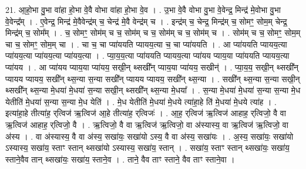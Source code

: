 \documentclass[17pt]{extarticle}
\begin{document}
21. आ॒हो॒भा वु॒भा वा॑हा हो॒भा वे॒वै वोभा वा॑हा हो॒भा वे॒व । . उ॒भा वे॒वै वोभा वु॒भा वे॒वेन्द्र॒ मिन्द्र॑ मे॒वोभा वु॒भा वे॒वेन्द्र᳚म् । . ए॒वेन्द्र॒ मिन्द्र॑ मे॒वैवेन्द्र॑म् च॒ चेन्द्र॑ मे॒वै वेन्द्र॑म् च । . इन्द्र॑म् च॒ चेन्द्र॒ मिन्द्र॑म् च॒ सोमꣳ॒॒ सोम॒म् चेन्द्र॒ मिन्द्र॑म् च॒ सोम᳚म् । . च॒ सोमꣳ॒॒ सोम॑म् च च॒ सोम॑म् च च॒ सोम॑म् च च॒ सोम॑म् च । . सोम॑म् च च॒ सोमꣳ॒॒ सोम॒म् चा च॒ सोमꣳ॒॒ सोम॒म् चा । . चा च॒ चा प्या॑ययति प्यायय॒त्या च॒ चा प्या॑ययति । . आ प्या॑ययति प्यायय॒त्या प्या॑यय॒त्या प्या॑यय॒त्या प्या॑यय॒त्या । . प्या॒य॒य॒त्या प्या॑ययति प्यायय॒त्या प्या॑यय प्याय॒या प्या॑ययति प्यायय॒त्या प्या॑यय । . आ प्या॑यय प्याय॒या प्या॑यय॒ सखी॒न् थ्सखी᳚न् प्याय॒या प्या॑यय॒ सखीन्॑ । . प्या॒य॒य॒ सखी॒न् थ्सखी᳚न् प्यायय प्यायय॒ सखी᳚न् थ्स॒न्या स॒न्या सखी᳚न् प्यायय प्यायय॒ सखी᳚न् थ्स॒न्या । . सखी᳚न् थ्स॒न्या स॒न्या सखी॒न् थ्सखी᳚न् थ्स॒न्या मे॒धया॑ मे॒धया॑ स॒न्या सखी॒न् थ्सखी᳚न् थ्स॒न्या मे॒धया᳚ । . स॒न्या मे॒धया॑ मे॒धया॑ स॒न्या स॒न्या मे॒ध येतीति॑ मे॒धया॑ स॒न्या स॒न्या मे॒ध येति॑ । . मे॒ध येतीति॑ मे॒धया॑ मे॒धये त्या॑हा॒हे ति॑ मे॒धया॑ मे॒धये त्या॑ह । . इत्या॑हा॒हे तीत्या॑ह॒ र्‌त्विज॑ ऋ॒त्विज॑ आ॒हे तीत्या॑ह॒ र्‌त्विजः॑ । . आ॒ह॒ र्‌त्विज॑ ऋ॒त्विज॑ आहाह॒ र्‌त्विजो॒ वै वा ऋ॒त्विज॑ आहाह॒ र्‌त्विजो॒ वै । . ऋ॒त्विजो॒ वै वा ऋ॒त्विज॑ ऋ॒त्विजो॒ वा अ॑स्यास्य॒ वा ऋ॒त्विज॑ ऋ॒त्विजो॒ वा अ॑स्य । . वा अ॑स्यास्य॒ वै वा अ॑स्य॒ सखा॑यः॒ सखा॑यो ऽस्य॒ वै वा अ॑स्य॒ सखा॑यः । . अ॒स्य॒ सखा॑यः॒ सखा॑यो ऽस्यास्य॒ सखा॑य॒ स्ताꣳ स्तान् थ्सखा॑यो ऽस्यास्य॒ सखा॑य॒ स्तान् । . सखा॑य॒ स्ताꣳ स्तान् थ्सखा॑यः॒ सखा॑य॒ स्ताने॒वैव तान् थ्सखा॑यः॒ सखा॑य॒ स्ताने॒व । . ताने॒ वैव ताꣳ स्ताने॒ वैव ताꣳ स्ताने॒वा । \newline
\end{document}
